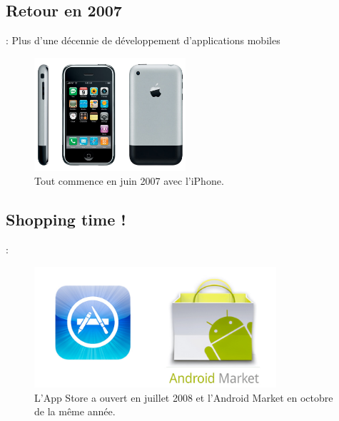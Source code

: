 \documentclass[10pt]{beamer}
\begin{document}
\subsection{Retour en 2007}
\begin{frame}[fragile,t]{\secname : \subsecname}
    Plus d'une décennie de développement d'applications mobiles
    \begin{figure}
        \begin{center}
            \includegraphics[width=0.5\textwidth]{../assets/img/Originele-iPhone.jpg}
            \caption*{Tout commence en juin 2007 avec l'iPhone.}
            \label{Fig:Originele-iPhone}
        \end{center}
    \end{figure}
\end{frame}

\subsection{Shopping time !}
\begin{frame}[fragile,t]{\secname : \subsecname}
    \begin{figure}
        \begin{center}
            \includegraphics[width=0.8\textwidth]{../assets/img/android_and_apple.jpg}
            \caption*{L'App Store a ouvert en juillet 2008 et l'Android Market en octobre de la même année.}
            \label{Fig:android_and_apple}
        \end{center}
    \end{figure}
\end{frame}
\end{document}
